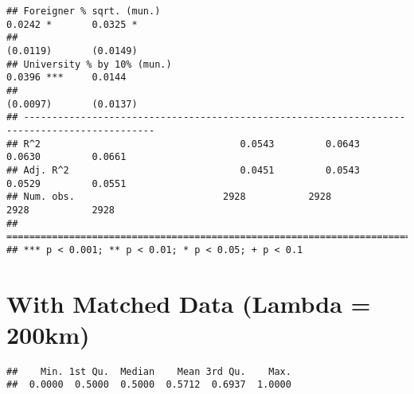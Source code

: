 \documentclass[
]{article}
\newenvironment{Shaded}{\begin{snugshade}}{\end{snugshade}}
\newcommand{\DecValTok}[1]{\textcolor[rgb]{0.00,0.00,0.81}{#1}}
\newcommand{\FloatTok}[1]{\textcolor[rgb]{0.00,0.00,0.81}{#1}}
\newcommand{\KeywordTok}[1]{\textcolor[rgb]{0.13,0.29,0.53}{\textbf{#1}}}
\newcommand{\NormalTok}[1]{#1}
\newcommand{\OperatorTok}[1]{\textcolor[rgb]{0.81,0.36,0.00}{\textbf{#1}}}
\newcommand{\StringTok}[1]{\textcolor[rgb]{0.31,0.60,0.02}{#1}}
\begin{document}
\begin{verbatim}
## Foreigner % sqrt. (mun.)                                            0.0242 *       0.0325 *  
##                                                                    (0.0119)       (0.0149)   
## University % by 10% (mun.)                                          0.0396 ***     0.0144    
##                                                                    (0.0097)       (0.0137)   
## ---------------------------------------------------------------------------------------------
## R^2                                   0.0543         0.0643         0.0630         0.0661    
## Adj. R^2                              0.0451         0.0543         0.0529         0.0551    
## Num. obs.                          2928           2928           2928           2928         
## =============================================================================================
## *** p < 0.001; ** p < 0.01; * p < 0.05; + p < 0.1
\end{verbatim}

\hypertarget{with-matched-data-lambda-200km}{%
\section{With Matched Data (Lambda =
200km)}\label{with-matched-data-lambda-200km}}

\begin{Shaded}
\end{Shaded}

\begin{verbatim}
##    Min. 1st Qu.  Median    Mean 3rd Qu.    Max. 
##  0.0000  0.5000  0.5000  0.5712  0.6937  1.0000
\end{verbatim}

\begin{Shaded}
\end{Shaded}
\end{document}
